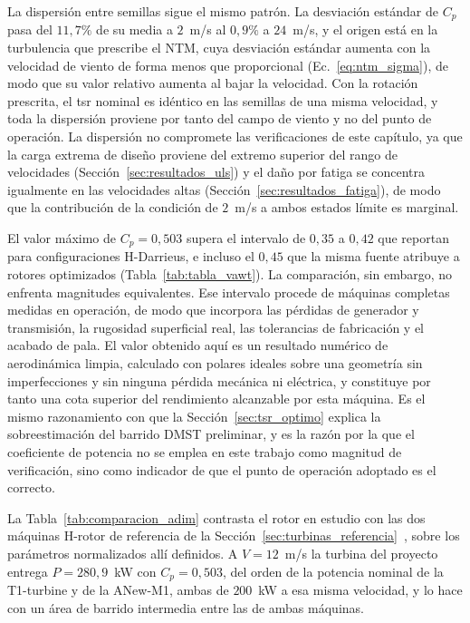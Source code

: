 La dispersión entre semillas sigue el mismo patrón. La desviación estándar de $C_p$ pasa del $11{,}7\%$ de su media a $2$~m/s al $0{,}9\%$ a $24$~m/s, y el origen está en la turbulencia que prescribe el NTM, cuya desviación estándar aumenta con la velocidad de viento de forma menos que proporcional (Ec.~\ref{eq:ntm_sigma}), de modo que su valor relativo aumenta al bajar la velocidad. Con la rotación prescrita, el \gls{tsr} nominal es idéntico en las semillas de una misma velocidad, y toda la dispersión proviene por tanto del campo de viento y no del punto de operación. La dispersión no compromete las verificaciones de este capítulo, ya que la carga extrema de diseño proviene del extremo superior del rango de velocidades (Sección~\ref{sec:resultados_uls}) y el daño por fatiga se concentra igualmente en las velocidades altas (Sección~\ref{sec:resultados_fatiga}), de modo que la contribución de la condición de $2$~m/s a ambos estados límite es marginal.

El valor máximo de $C_p = 0{,}503$ supera el intervalo de $0{,}35$ a $0{,}42$ que \textcite{Essahraoui2026} reportan para configuraciones H-Darrieus, e incluso el $0{,}45$ que la misma fuente atribuye a rotores optimizados (Tabla~\ref{tab:tabla_vawt}). La comparación, sin embargo, no enfrenta magnitudes equivalentes. Ese intervalo procede de máquinas completas medidas en operación, de modo que incorpora las pérdidas de generador y transmisión, la rugosidad superficial real, las tolerancias de fabricación y el acabado de pala. El valor obtenido aquí es un resultado numérico de aerodinámica limpia, calculado con polares ideales sobre una geometría sin imperfecciones y sin ninguna pérdida mecánica ni eléctrica, y constituye por tanto una cota superior del rendimiento alcanzable por esta máquina. Es el mismo razonamiento con que la Sección~\ref{sec:tsr_optimo} explica la sobreestimación del barrido DMST preliminar, y es la razón por la que el coeficiente de potencia no se emplea en este trabajo como magnitud de verificación, sino como indicador de que el punto de operación adoptado es el correcto.

La Tabla~\ref{tab:comparacion_adim} contrasta el rotor en estudio con las dos máquinas H-rotor de referencia de la Sección~\ref{sec:turbinas_referencia}~\parencite{Mollerstrom2019}, sobre los parámetros normalizados allí definidos. A $V = 12$~m/s la turbina del proyecto entrega $P = 280{,}9$~kW con $C_p = 0{,}503$, del orden de la potencia nominal de la T1-turbine y de la ANew-M1, ambas de $200$~kW a esa misma velocidad, y lo hace con un área de barrido intermedia entre las de ambas máquinas.

